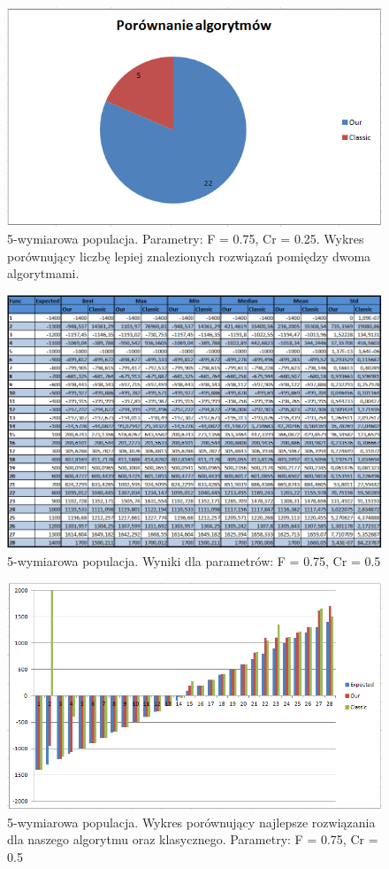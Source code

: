 \documentclass[a4paper]{article}
\begin{document}
\begin{figure}[!h]
\centering
\includegraphics[width=\textwidth]{F75Cr25L5statystyka.png}
\caption{5-wymiarowa populacja. Parametry: F = 0.75, Cr = 0.25. Wykres porównujący liczbę lepiej znalezionych rozwiązań pomiędzy dwoma algorytmami.}
\end{figure}

\begin{figure}[!h]
\centering
\includegraphics[width=\textwidth]{F75Cr5L5tab.png}
\caption{5-wymiarowa populacja. Wyniki dla parametrów: F = 0.75, Cr = 0.5}
\end{figure}

\begin{figure}[!h]
\centering
\includegraphics[width=\textwidth]{F75Cr5L5chart.png}
\caption{5-wymiarowa populacja. Wykres porównujący najlepsze rozwiązania dla naszego algorytmu oraz klasycznego. Parametry: F = 0.75, Cr = 0.5}
\end{figure}
\end{document}
